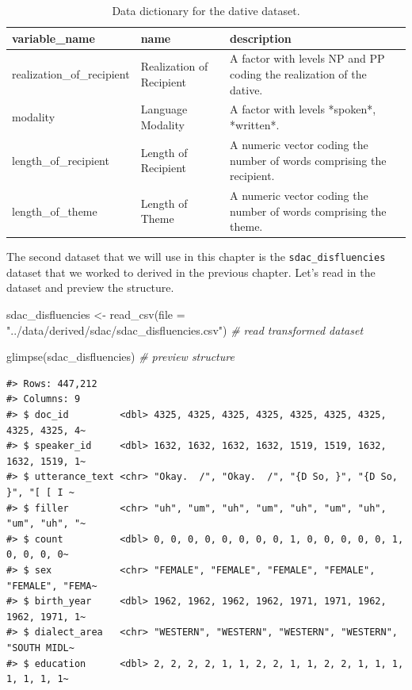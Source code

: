 \documentclass[
  letterpaper,
]{scrbook}
\newenvironment{Shaded}{\begin{snugshade}}{\end{snugshade}}
\newcommand{\AttributeTok}[1]{\textcolor[rgb]{0.00,0.00,0.00}{#1}}
\newcommand{\CommentTok}[1]{\textcolor[rgb]{0.00,0.00,0.00}{\textit{#1}}}
\newcommand{\FunctionTok}[1]{\textcolor[rgb]{0.00,0.00,0.00}{#1}}
\newcommand{\NormalTok}[1]{\textcolor[rgb]{0.00,0.00,0.00}{#1}}
\newcommand{\OtherTok}[1]{\textcolor[rgb]{0.00,0.00,0.00}{#1}}
\newcommand{\StringTok}[1]{\textcolor[rgb]{0.00,0.00,0.00}{#1}}
\begin{document}
\hypertarget{tbl-i-dative-dictionary}{}
\begin{table}
\caption{\label{tbl-i-dative-dictionary}Data dictionary for the dative dataset. }\tabularnewline

\centering
\begin{tabular}{lll}
\toprule
variable\_name & name & description\\
\midrule
realization\_of\_recipient & Realization of Recipient & A factor with levels NP and PP coding the realization of the dative.\\
modality & Language Modality & A factor with levels *spoken*, *written*.\\
length\_of\_recipient & Length of Recipient & A numeric vector coding the number of words comprising the recipient.\\
length\_of\_theme & Length of Theme & A numeric vector coding the number of words comprising the theme.\\
\bottomrule
\end{tabular}
\end{table}

The second dataset that we will use in this chapter is the
\texttt{sdac\_disfluencies} dataset that we worked to derived in the
previous chapter. Let's read in the dataset and preview the structure.

\begin{Shaded}
\begin{Highlighting}[]
\NormalTok{sdac\_disfluencies }\OtherTok{\textless{}{-}} 
  \FunctionTok{read\_csv}\NormalTok{(}\AttributeTok{file =} \StringTok{"../data/derived/sdac/sdac\_disfluencies.csv"}\NormalTok{) }\CommentTok{\# read transformed dataset}

\FunctionTok{glimpse}\NormalTok{(sdac\_disfluencies) }\CommentTok{\# preview structure}
\end{Highlighting}
\end{Shaded}

\begin{verbatim}
#> Rows: 447,212
#> Columns: 9
#> $ doc_id         <dbl> 4325, 4325, 4325, 4325, 4325, 4325, 4325, 4325, 4325, 4~
#> $ speaker_id     <dbl> 1632, 1632, 1632, 1632, 1519, 1519, 1632, 1632, 1519, 1~
#> $ utterance_text <chr> "Okay.  /", "Okay.  /", "{D So, }", "{D So, }", "[ [ I ~
#> $ filler         <chr> "uh", "um", "uh", "um", "uh", "um", "uh", "um", "uh", "~
#> $ count          <dbl> 0, 0, 0, 0, 0, 0, 0, 0, 1, 0, 0, 0, 0, 0, 1, 0, 0, 0, 0~
#> $ sex            <chr> "FEMALE", "FEMALE", "FEMALE", "FEMALE", "FEMALE", "FEMA~
#> $ birth_year     <dbl> 1962, 1962, 1962, 1962, 1971, 1971, 1962, 1962, 1971, 1~
#> $ dialect_area   <chr> "WESTERN", "WESTERN", "WESTERN", "WESTERN", "SOUTH MIDL~
#> $ education      <dbl> 2, 2, 2, 2, 1, 1, 2, 2, 1, 1, 2, 2, 1, 1, 1, 1, 1, 1, 1~
\end{verbatim}
\end{document}
